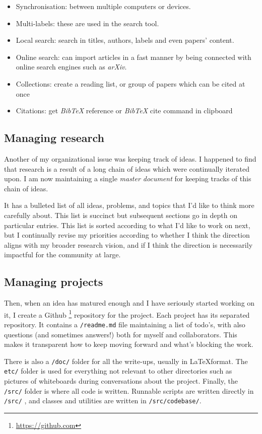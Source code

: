 \begin{itemize}
\item Synchronisation: between multiple computers or devices.
\item Multi-labels: these are used in the search tool.
\item Local search: search in titles, authors, labels and even papers' content.
\item Online search: can import articles in a fast manner by being connected with online search engines such as \emph{arXiv}.
\item Collections: create a reading list, or group of papers which can be cited at once
\item Citations: get \emph{BibTeX} reference or \emph{BibTeX} cite command in clipboard
\end{itemize}

\subsection{Managing research}
Another of my organizational issue was keeping track of ideas.
I happened to find that research is a result of a long chain of ideas which were continually iterated upon.
I am now maintaining a single \textit{master document} for keeping tracks of this chain of ideas.

It has a bulleted list of all ideas, problems, and topics that I’d like to think more carefully about. This list is succinct but subsequent sections go in depth on particular entries.
This list is sorted according to what I’d like to work on next, but I continually revise my priorities according to whether I think the direction aligns with my broader research vision, and if I think the direction is necessarily impactful for the community at large.

\subsection{Managing projects}
Then, when an idea has matured enough and I have seriously started working on it, I create a Github \footnote{\url{https://github.com}} repository for the project. Each project has its separated repository. 
It contains a \texttt{/readme.md} file maintaining a list of todo’s, with also questions (and sometimes answers!) both for myself and collaborators. This makes it transparent how to keep moving forward and what’s blocking the work.

There is also a \texttt{/doc/} folder for all the write-ups, usually in \LaTeX  format.
The  \texttt{etc/} folder is used for everything not relevant to other directories such as pictures of whiteboards during conversations about the project.
Finally, the \texttt{/src/} folder is where all code is written. Runnable scripts are written directly in \texttt{/src/} , and classes and utilities are written in \texttt{/src/codebase/}. 